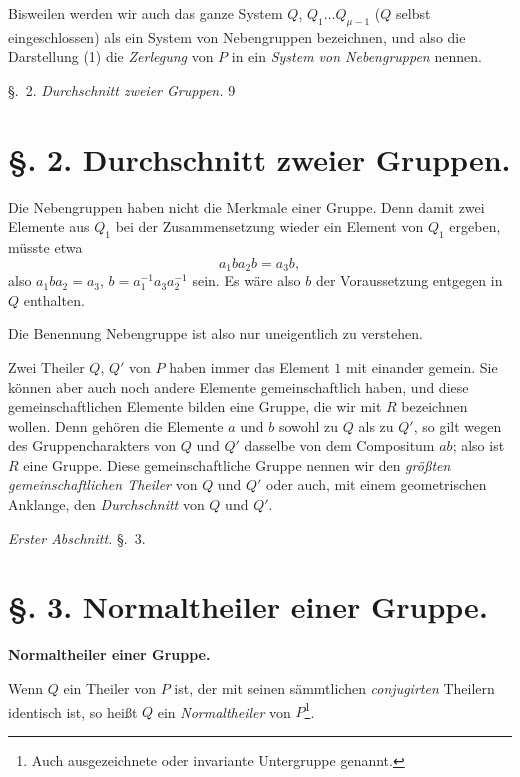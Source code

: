 \documentclass[12pt,a4paper]{book}
\begin{document}
Bisweilen werden wir auch das ganze System $Q$, $Q_1 \ldots Q_{\mu-1}$ ($Q$ selbst eingeschlossen) als ein System von Nebengruppen bezeichnen, und also die Darstellung (1) die \textit{Zerlegung} von $P$ in ein \textit{System von Nebengruppen} nennen.

\newpage
\noindent\S.~2. \hfill \textit{Durchschnitt zweier Gruppen.} \hfill 9

\vspace{0.3cm}

\section*{\S. 2. Durchschnitt zweier Gruppen.}

Die Nebengruppen haben nicht die Merkmale einer Gruppe. Denn damit zwei Elemente aus $Q_1$ bei der Zusammensetzung wieder ein Element von $Q_1$ ergeben, m\"usste etwa
\[a_1ba_2b = a_3b,\]
also $a_1ba_2 = a_3$, $b = a_1^{-1}a_3a_2^{-1}$ sein. Es w\"are also $b$ der Voraussetzung entgegen in $Q$ enthalten.

Die Benennung Nebengruppe ist also nur uneigentlich zu verstehen.

Zwei Theiler $Q$, $Q'$ von $P$ haben immer das Element $1$ mit einander gemein. Sie k\"onnen aber auch noch andere Elemente gemeinschaftlich haben, und diese gemeinschaftlichen Elemente bilden eine Gruppe, die wir mit $R$ bezeichnen wollen. Denn geh\"oren die Elemente $a$ und $b$ sowohl zu $Q$ als zu $Q'$, so gilt wegen des Gruppencharakters von $Q$ und $Q'$ dasselbe von dem Compositum $ab$; also ist $R$ eine Gruppe. Diese gemeinschaftliche Gruppe nennen wir den \textit{gr\"o\ss ten gemeinschaftlichen Theiler} von $Q$ und $Q'$ oder auch, mit einem geometrischen Anklange, den \textit{Durchschnitt} von $Q$ und $Q'$.

\newpage
{} \hfill \textit{Erster Abschnitt.} \hfill \S.~3.

\vspace{0.3cm}

\section*{\S. 3. Normaltheiler einer Gruppe.}

\begin{center}
\textbf{Normaltheiler einer Gruppe.}
\end{center}

Wenn $Q$ ein Theiler von $P$ ist, der mit seinen s\"ammtlichen \textit{conjugirten} Theilern identisch ist, so hei\ss t $Q$ ein \textit{Normaltheiler} von $P$\footnote{Auch ausgezeichnete oder invariante Untergruppe genannt.}.
\end{document}
